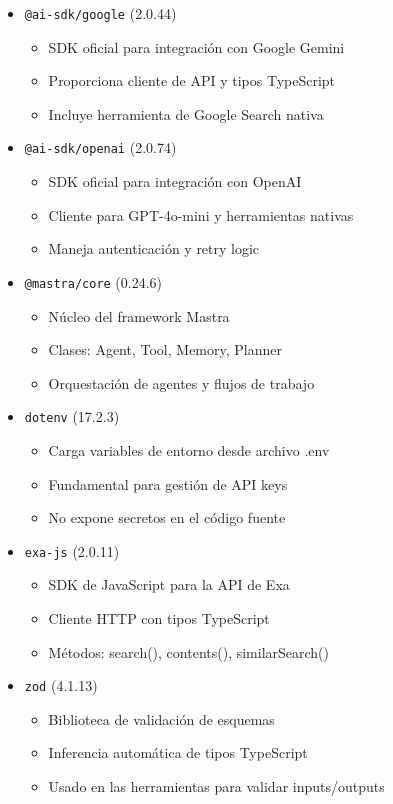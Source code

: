 \documentclass[12pt,a4paper]{article}
\begin{document}
\begin{itemize}
    \item \texttt{@ai-sdk/google} (2.0.44)
    \begin{itemize}
        \item SDK oficial para integración con Google Gemini
        \item Proporciona cliente de API y tipos TypeScript
        \item Incluye herramienta de Google Search nativa
    \end{itemize}

    \item \texttt{@ai-sdk/openai} (2.0.74)
    \begin{itemize}
        \item SDK oficial para integración con OpenAI
        \item Cliente para GPT-4o-mini y herramientas nativas
        \item Maneja autenticación y retry logic
    \end{itemize}

    \item \texttt{@mastra/core} (0.24.6)
    \begin{itemize}
        \item Núcleo del framework Mastra
        \item Clases: Agent, Tool, Memory, Planner
        \item Orquestación de agentes y flujos de trabajo
    \end{itemize}

    \item \texttt{dotenv} (17.2.3)
    \begin{itemize}
        \item Carga variables de entorno desde archivo .env
        \item Fundamental para gestión de API keys
        \item No expone secretos en el código fuente
    \end{itemize}

    \item \texttt{exa-js} (2.0.11)
    \begin{itemize}
        \item SDK de JavaScript para la API de Exa
        \item Cliente HTTP con tipos TypeScript
        \item Métodos: search(), contents(), similarSearch()
    \end{itemize}

    \item \texttt{zod} (4.1.13)
    \begin{itemize}
        \item Biblioteca de validación de esquemas
        \item Inferencia automática de tipos TypeScript
        \item Usado en las herramientas para validar inputs/outputs
    \end{itemize}
\end{itemize}
\end{document}
